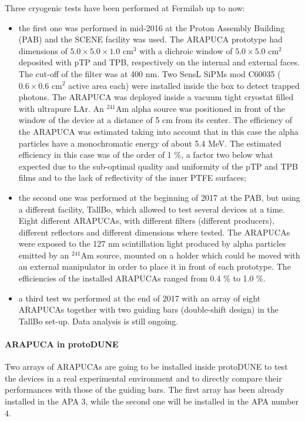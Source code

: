Three cryogenic tests have been performed at Fermilab up to now:
\begin{itemize}
\item the first one was performed in mid-2016 at the Proton Assembly Building (PAB) and the SCENE facility was used. The ARAPUCA prototype had dimensions of  $5.0 \times 5.0 \times 1.0$ cm$^3$ with a dichroic window of $5.0 \times 5.0$ cm$^2$ deposited with pTP and TPB, respectively on the internal and external faces. The cut-off of the filter was at 400 nm. Two SensL SiPMs mod C60035 ($0.6 \times 0.6$ cm$^2$ active area each) were installed inside the box to detect trapped photons. The ARAPUCA was deployed inside a vacuum tight cryostat filled with ultrapure LAr. An $^{241}$Am alpha source was positioned in front of the window of the device at a distance of 5 cm from its center. The efficiency of the ARAPUCA was estimated taking into account that in this case the alpha particles have a  
monochromatic energy of about 5.4 MeV. The estimated efficiency in this case was of the order of 1 \%, a factor two below what expected due to the sub-optimal quality and uniformity of the pTP and TPB films and to the lack of reflectivity of the inner PTFE surfaces;

\item the second one was performed at the beginning of 2017 at the PAB, but using a different facility, 
TallBo, which allowed to test several devices at a time. Eight different ARAPUCAs, with different 
filters (different producers), different reflectors and different dimensions where tested. The ARAPUCAs 
were exposed to the 127 nm scintillation light produced by alpha particles emitted by an $^{241}$Am 
source, mounted on a holder which could be moved with an external manipulator in order to place it in 
front of each prototype. The efficiencies of the installed ARAPUCAs ranged from 0.4 \% to 1.0 \%.

\item a third test ws performed at the end of 2017 with an array of eight ARAPUCAs together with two 
guiding bars (double-shift design) in the TallBo set-up. Data analysis is still ongoing. 

\end{itemize}

\paragraph*{ARAPUCA in protoDUNE}

Two arrays of ARAPUCAs are going to be installed inside protoDUNE to test the devices in a real experimental environment and to directly compare their performances with those of the guiding bars. The first array has been already installed in the APA 3, while the second one will be installed in the APA number 4.
 
